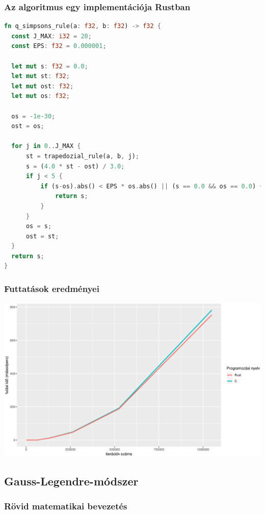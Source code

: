 \subsubsection{Az algoritmus egy implementációja Rustban}
\begin{lstlisting}[language=Rust]
fn q_simpsons_rule(a: f32, b: f32) -> f32 {
  const J_MAX: i32 = 20;
  const EPS: f32 = 0.000001;
	  
  let mut s: f32 = 0.0;
  let mut st: f32;
  let mut ost: f32;
  let mut os: f32;
  
  os = -1e-30;
  ost = os;
  
  for j in 0..J_MAX {
	  st = trapedozial_rule(a, b, j);
	  s = (4.0 * st - ost) / 3.0;
	  if j < 5 {
		  if (s-os).abs() < EPS * os.abs() || (s == 0.0 && os == 0.0) {
			  return s;
		  }
	  }
	  os = s;
	  ost = st;
  }
  return s;
}
\end{lstlisting}
\subsubsection{Futtatások eredményei}
\includegraphics[width=15.5cm]{kepek/simpsons_run.eps}
\subsection{Gauss-Legendre-módszer}
\subsubsection{Rövid matematikai bevezetés}
